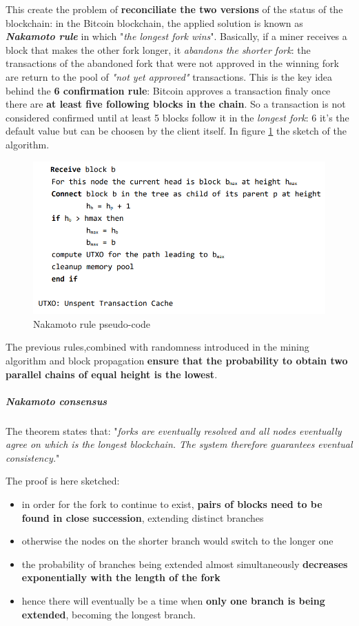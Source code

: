 \documentclass[10pt,a4paper]{report}
\begin{document}
This create the problem of \textbf{reconciliate the two versions} of the status of the blockchain: in the Bitcoin blockchain, the applied solution is known as  \textit{\textbf{Nakamoto rule}} in which "\textit{the longest fork wins}". Basically, if a miner receives a block that makes the other fork longer, it \textit{abandons the shorter fork}: the transactions of the abandoned fork that were not approved in the winning fork are return to the pool of \textit{"not yet approved"} transactions.
This is the key idea behind the \textbf{6 confirmation rule}: Bitcoin approves a transaction finaly once there are \textbf{at least five following blocks in the chain}. So a transaction is not considered confirmed until at least 5 blocks follow it in the \textit{longest fork}: 6 it's the default  value but can be choosen by the client itself.
In figure \ref{nakamoto-rule} the sketch of the algorithm. 
\begin{figure}[h]
	\centering
	\includegraphics[scale=0.50]{images/Pasted image 20230411105523.png}
	\caption{Nakamoto rule pseudo-code}
	\label{nakamoto-rule}
\end{figure}


The previous rules,combined with randomness introduced in the mining algorithm and block propagation \textbf{ensure that the probability to obtain two parallel chains of equal height is the lowest}.
\subparagraph{Nakamoto consensus}\label{sec:nakamoto-consensus}
The theorem states that:
"\textit{forks are eventually resolved and all nodes eventually agree on which is the longest blockchain. The system therefore guarantees eventual consistency.}"

The proof is here sketched:
\begin{itemize}
	\item 
	in order for the fork to continue to exist, \textbf{pairs of blocks need to be found in close succession}, extending distinct branches
	\item 
	otherwise the nodes on the shorter branch would switch to the longer one
	\item 
	the probability of branches being extended almost simultaneously \textbf{decreases exponentially with the length of the fork}
	\item 
	hence there will eventually be a time when \textbf{only one branch is being extended}, becoming the longest branch.
\end{itemize}
\end{document}
